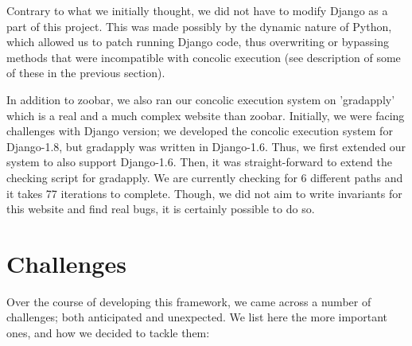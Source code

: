 \documentclass{scrartcl}
\begin{document}
Contrary to what we initially thought, we did not have to modify Django as a
part of this project. This was made possibly by the dynamic nature of Python,
which allowed us to patch running Django code, thus overwriting or bypassing
methods that were incompatible with concolic execution (see description of some
of these in the previous section).

In addition to zoobar, we also ran our concolic execution system on
'gradapply' which is a real and a much complex website than zoobar.
Initially, we were facing challenges with Django version; we developed
the concolic execution system for Django-1.8, but gradapply was written
in Django-1.6. Thus, we first extended our system to also support
Django-1.6. Then, it was straight-forward to extend the checking script
for gradapply. We are currently checking for 6 different paths and it takes
77 iterations to complete. Though, we did not aim to write invariants for
this website and find real bugs, it is certainly possible to do so.


\section{Challenges}

Over the course of developing this framework, we came across a number of
challenges; both anticipated and unexpected. We list here the more important
ones, and how we decided to tackle them:
\end{document}
